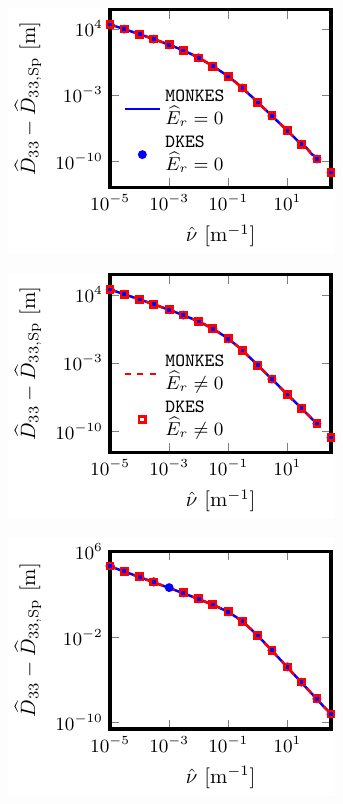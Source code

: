 \documentclass[10pt]{iopart}
\begin{document}
\begin{figure}[h]
	\captionsetup[sub]{skip=-1.75pt, margin=95pt}
	\centering
	\begin{subfigure}[t]{0.32\textwidth}	
		\includegraphics{Benchmark-W7X-EIM-s0200-D33}
%		
		\caption{}
		\label{subfig:D33_Benchmark_W7X_EIM}
	\end{subfigure}
	\begin{subfigure}[t]{0.32\textwidth}		
		\includegraphics{Benchmark-W7X-KJM-s0204-D33}
		\caption{}
		\label{subfig:D33_Benchmark_W7X_KJM}
	\end{subfigure}
	\begin{subfigure}[t]{0.32\textwidth}
		\includegraphics{Benchmark-CIEMAT-QI-s0250-D33}

\end{subfigure}
\end{figure}
\end{document}
